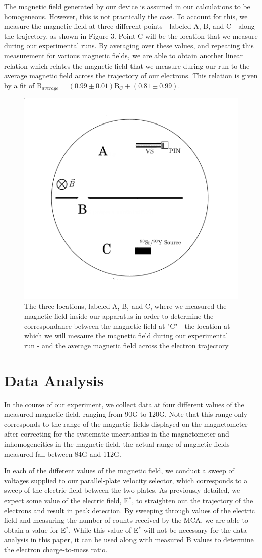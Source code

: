 The magnetic field generated by our device is assumed in our calculations to be homogeneous. However, this is not practically the case. To account for this, we measure the magnetic field at three different points - labeled A, B, and C - along the trajectory, as shown in Figure 3. Point C will be the location that we measure during our experimental runs. By averaging over these values, and repeating this measurement for various magnetic fields, we are able to obtain another linear relation which relates the magnetic field that we measure during our run to the average magnetic field across the trajectory of our electrons. This relation is given by a fit of $\text{B}_{average} = (0.99 \pm 0.01) \text{B}_C + (0.81 \pm 0.99)$.
\begin{figure}[h]
  \includegraphics[width=.5\textwidth]{inhomo.png}
  \caption{The three locations, labeled A, B, and C, where we measured the magnetic field inside our apparatus in order to determine the correspondance between the magnetic field at "C" - the location at which we will mesaure the magnetic field during our experimental run - and the average magnetic field across the electron trajectory}
\end{figure}
\section{Data Analysis}
In the course of our experiment, we collect data at four different values of the measured magnetic field, ranging from 90G to 120G. Note that this range only corresponds to the range of the magnetic fields displayed on the magnetometer - after correcting for the systematic uncertanties in the magnetometer and inhomogeneities in the magnetic field, the actual range of magnetic fields measured fall between 84G and 112G.

In each of the different values of the magnetic field, we conduct a sweep of voltages supplied to our parallel-plate velocity selector, which corresponds to a sweep of the electric field between the two plates. As previously detailed, we expect some value of the electric field, E$^*$,  to straighten out the trajectory of the electrons and result in peak detection. By sweeping through values of the electric field and measuring the number of counts received by the MCA, we are able to obtain a value for E$^*$. While this value of E$^*$ will not be necessary for the data analysis in this paper, it can be used along with measured B values to determine the electron charge-to-mass ratio.

